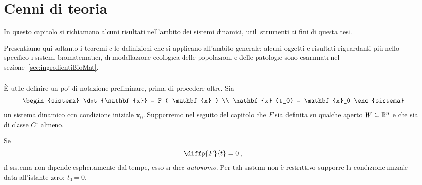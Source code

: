 %
%








\chapter{Cenni di teoria}
\label{chap:teoria}
In questo capitolo si richiamano alcuni risultati nell'ambito dei sistemi dinamici, utili strumenti ai fini
di questa tesi.

Presentiamo qui soltanto i teoremi e le definizioni che si applicano all'ambito generale; alcuni oggetti
e risultati riguardanti più nello specifico i sistemi biomatematici, di modellazione ecologica delle popolazioni
e delle patologie sono esaminati nel sezione~\ref{sec:ingredientiBioMat}.

\paragraph{}
È utile definire un po' di notazione preliminare, prima di procedere oltre.
Sia
$$\begin{sistema}
\dot{\mathbf{x}} = F ( \mathbf{x} ) \\
\mathbf{x} (t_0) = \mathbf{x}_0
\end{sistema}$$
un sistema dinamico con condizione iniziale $\mathbf{x}_0$. Supporremo nel seguito del capitolo che $F$ sia
definita su qualche aperto $W \subseteq \mathbb{R}^n$ e che sia di classe $C^1$ almeno.

Se
$$\diffp{F}{t} = 0 \; ,$$
\ie il sistema non dipende esplicitamente dal tempo, esso si dice \emph{autonomo}.
Per tali sistemi non è restrittivo supporre la condizione iniziale data all'istante zero: $t_0=0$.

